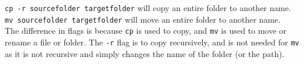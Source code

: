 \begin{ans}
  \texttt{cp -r sourcefolder targetfolder} will copy an entire folder to another name. \\
  \texttt{mv sourcefolder targetfolder} will move an entire folder to another name. \\
  The difference in flags is because \texttt{cp} is used to copy, and \texttt{mv} is used to move or rename a file or folder.
  The \texttt{-r} flag is to copy recursively, and is not needed for \texttt{mv} as it is not recursive
  and simply changes the name of the folder (or the path).
\end{ans}
